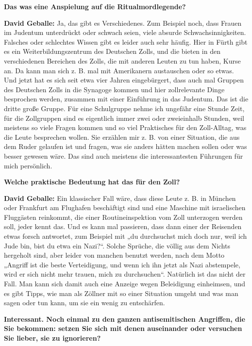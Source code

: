\textbf{Das was eine Anspielung auf die Ritualmordlegende?} 

\textbf{David Geballe:} Ja, das gibt es Verschiedenes. Zum Beispiel noch, dass Frauen im Judentum unterdrückt oder schwach seien, viele absurde Schwachsinnigkeiten. Falsches oder schlechtes Wissen gibt es leider auch sehr häufig. Hier in Fürth gibt es ein Weiterbildungszentrum des Deutschen Zolls, und die bieten in den verschiedenen Bereichen des Zolls, die mit anderen Leuten zu tun haben, Kurse an. Da kann man sich z. B. mal mit Amerikanern austauschen oder so etwas. Und jetzt hat es sich seit etwa vier Jahren eingebürgert, dass auch mal Gruppen des Deutschen Zolls in die Synagoge kommen und hier zollrelevante Dinge besprochen werden, zusammen mit einer Einführung in das Judentum. Das ist die dritte große Gruppe. Für eine Schulgruppe nehme ich ungefähr eine Stunde Zeit, für die Zollgruppen sind es eigentlich immer zwei oder zweieinhalb Stunden, weil meistens so viele Fragen kommen und so viel Praktisches für den Zoll-Alltag, was die Leute besprechen wollen. Sie erzählen mir z. B. von einer Situation, die aus dem Ruder gelaufen ist und fragen, was sie anders hätten machen sollen oder was besser gewesen wäre. Das sind auch meistens die interessantesten Führungen für mich persönlich. 

\textbf{Welche praktische Bedeutung hat das für den Zoll?}

\textbf{David Geballe:} Ein klassischer Fall wäre, dass diese Leute z. B. in München oder Frankfurt am Flughafen beschäftigt sind und eine Maschine mit israelischen Fluggästen reinkommt, die einer Routineinspektion vom Zoll unterzogen werden soll, jeder kennt das. Und es kann mal passieren, dass dann einer der Reisenden etwas forsch antwortet, zum Beispiel mit „du durchsuchst mich doch nur, weil ich Jude bin, bist du etwa ein Nazi?“. Solche Sprüche, die völlig aus dem Nichts hergeholt sind, aber leider von manchen benutzt werden, nach dem Motto „Angriff ist die beste Verteidigung, und wenn ich ihn jetzt als Nazi abstempele, wird er sich nicht mehr trauen, mich zu durchsuchen“. Natürlich ist das nicht der Fall. Man kann sich damit auch eine Anzeige wegen Beleidigung einheimsen, und es gibt Tipps, wie man als Zöllner mit so einer Situation umgeht und was man sagen oder tun kann, um sie ein wenig zu entschärfen. 

\textbf{Interessant. Noch einmal zu den ganzen antisemitischen Angriffen, die Sie bekommen: setzen Sie sich mit denen auseinander oder versuchen Sie lieber, sie zu ignorieren?} 

